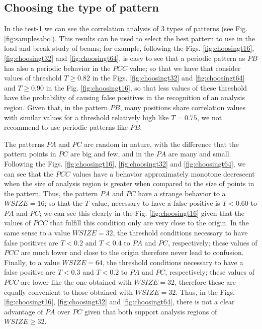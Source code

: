 \subsection{Choosing the type of pattern}

In the test-1 we can see the correlation analysis of 3 types of patterns
(see Fig. \ref{fig:samplesabc}). This results can be used to select the best pattern
to use in the  load and break study of beams; for example, following the 
Figs. \ref{fig:choosingt16}, \ref{fig:choosingt32} and \ref{fig:choosingt64},
is easy to see that a periodic pattern as $PB$ has also a periodic behavior
in the $PCC$ value; so that we have that consider values of threshold $T \geq 0.82$ 
in the Figs. \ref{fig:choosingt32} and \ref{fig:choosingt64} and $T \geq 0.90$
in the Fig. \ref{fig:choosingt16}, so that
less values of these threshold have the probability of causing false positives in the recognition of an 
analysis region. Given that, in the pattern $PB$, many positions share correlation values with similar values
for a threshold relatively high like $T=0.75$, we not recommend to use periodic patterns like $PB$.

The patterns $PA$ and $PC$ are random in nature, with the difference
that the pattern points in $PC$ are big  and few, and in the $PA$
are many and small. Following the 
Figs. \ref{fig:choosingt16}, \ref{fig:choosingt32} and \ref{fig:choosingt64},
we can see that the $PCC$ values have a behavior approximately monotone decrescent
when the size of analysis region is greater when compared to the size of points
in the pattern. Thus, the pattern $PA$ and $PC$ have a strange behavior to a $WSIZE=16$;
so that the $T$ value, necessary to have  a false positive is
$T<0.60$ to $PA$ and $PC$; we can see this clearly in the Fig. \ref{fig:choosingt16} 
given that the values of $PCC$ that fulfill this condition only are very close to the origin.
In the same sense to a value $WSIZE = 32$, 
the threshold conditions necessary to have  false positives
are $T<0.2$ and $T<0.4$ to $PA$ and $PC$, respectively; these values of $PCC$ are much lower 
and close to the origin therefore never lead to confusion.
Finally, to a  value $WSIZE = 64$, 
the threshold conditions necessary to have  a false positive 
are $T<0.3$ and $T<0.2$ to $PA$ and $PC$, respectively; 
these values of $PCC$ are lower like the one obtained with $WSIZE = 32$,
therefore these are equally convenient to those obtained with $WSIZE = 32$.
Thus, in the Figs. \ref{fig:choosingt16}, \ref{fig:choosingt32} and \ref{fig:choosingt64},
there is not a clear advantage of $PA$ over $PC$ given that both support analysis regions
of $WSIZE \geq 32$.

